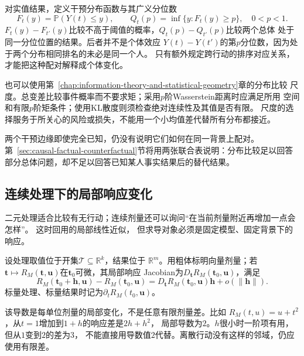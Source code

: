 对实值结果，定义干预分布函数与其广义分位数
\[
  F_t(y)=\mathbb P(Y(t)\leq y),\qquad
  Q_t(p)=\inf\{y:F_t(y)\geq p\},\quad 0<p<1.
\]
\(F_t(y)-F_{t'}(y)\)比较不高于阈值的概率，\(Q_t(p)-Q_{t'}(p)\)比较两个总体
处于同一分位位置的结果。后者并不是个体效应
\(Y(t)-Y(t')\)的第\(p\)分位数，因为处于两个分布相同排名的未必是同一个人。
只有额外规定跨行动的排序对应关系，才能把这种配对解释成个体变化。

也可以使用第~\ref{chap:information-theory-and-statistical-geometry}章的分布比较
尺度。总变差比较事件概率而不要求矩；采用\(p\)阶Wasserstein距离时应满足所用
空间和有限\(p\)阶矩条件；使用KL散度则须检查绝对连续性及其值是否有限。
尺度的选择服务于所关心的风险或损失，不能用一个小均值差代替所有分布都接近。

两个干预边缘即使完全已知，仍没有说明它们如何在同一背景上配对。
第~\ref{sec:causal-factual-counterfactual}节将用两张联合表说明：分布比较足以回答
部分总体问题，却不足以回答已知某人事实结果后的替代结果。

\subsection{连续处理下的局部响应变化}
\label{sec:causal-local-response}

二元处理适合比较有无行动；连续剂量还可以询问“在当前剂量附近再增加一点会怎样”。
这时回用的局部线性近似，
但求导对象必须是固定模型、固定背景下的响应。

\begin{definition}[局部响应导数]
  \label{def:causal-local-response}
  设处理取值位于开集\(\mathcal T\subseteq\mathbb R^k\)，结果位于
  \(\mathbb R^m\)。用粗体标明向量剂量；若
  \(\bm t\mapsto R_M(\bm t,\bm u)\)在\(\bm t_0\)可微，其局部响应
  Jacobian为\(D_{\bm t}R_M(\bm t_0,\bm u)\)，满足
  \[
    R_M(\bm t_0+\bm h,\bm u)-R_M(\bm t_0,\bm u)
    =D_{\bm t}R_M(\bm t_0,\bm u)\bm h+o(\|\bm h\|).
  \]
  标量处理、标量结果时记为\(\partial_tR_M(t_0,\bm u)\)。
\end{definition}

该导数是每单位剂量的局部变化，不是任意有限剂量差。比如
\(R_M(t,u)=u+t^2\)，从\(t=1\)增加到\(1+h\)的响应差是\(2h+h^2\)，
局部导数为\(2\)。\(h\)很小时一阶项有用，但从\(1\)变到\(2\)的差为\(3\)，
不能直接用导数值\(2\)代替。离散行动没有这样的邻域，仍应使用有限差。


